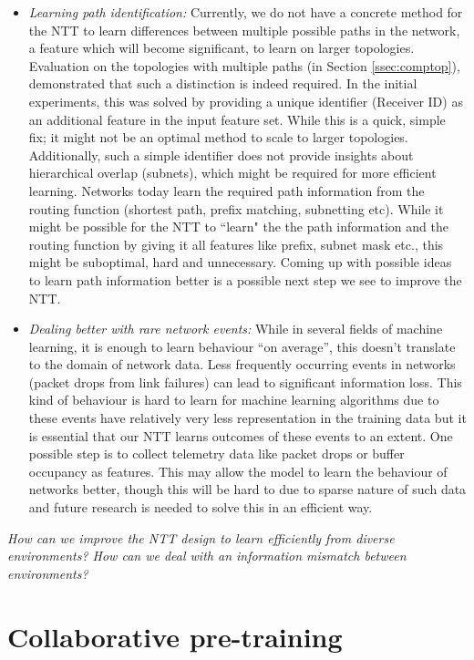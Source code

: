 \begin{itemize}
\item \emph{Learning path identification:} Currently, we do not have a concrete method for the NTT to learn differences between multiple possible paths in the network, a feature which will become significant, to learn on larger topologies. Evaluation on the topologies with multiple paths (in Section \ref{ssec:comptop}), demonstrated that such a distinction is indeed required. In the initial experiments, this was solved by providing a unique identifier (Receiver ID) as an additional feature in the input feature set. While this is a quick, simple fix; it might not be an optimal method to scale to larger topologies. Additionally, such a simple identifier does not provide insights about hierarchical overlap (\eg subnets), which might be required for more efficient learning. Networks today learn the required path information from the routing function (\eg shortest path, prefix matching, subnetting etc). While it might be possible for the NTT to ``learn" the the path information and the routing function by giving it all features like prefix, subnet mask etc., this might be suboptimal, hard and unnecessary. Coming up with possible ideas to learn path information better is a possible next step we see to improve the NTT.

\item \emph{Dealing better with rare network events:} While in several fields of machine learning, it is enough to learn behaviour ``on average'', this doesn't translate to the domain of network data. Less frequently occurring events in networks (\eg packet drops from link failures) can lead to significant information loss. This kind of behaviour is hard to learn for machine learning algorithms due to these events have relatively very less representation in the training data but it is essential that our NTT learns outcomes of these events to an extent. One possible step is to collect telemetry data like packet drops or buffer occupancy as features. This may allow the model to learn the behaviour of networks better, though this will be hard to due to sparse nature of such data and future research is needed to solve this in an efficient way.
\end{itemize}
\vspace{-0.3cm}
\emph{How can we improve the NTT design to learn efficiently from diverse environments? How can we deal with an information mismatch between environments?}


\section{Collaborative pre-training}
\label{sec:collab}

